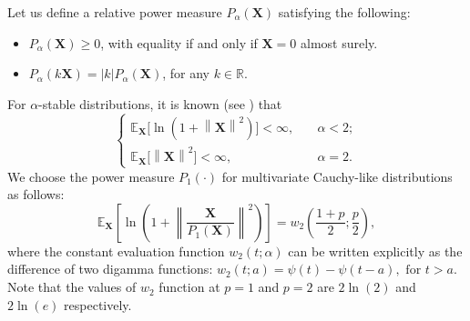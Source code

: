 \documentclass[conference]{IEEEtran}
\newcommand{\R}{\mathbb{R}}
\newcommand{\E}{\mathbb{E}}
\theoremstyle{definition}
\theoremstyle{plain}
\newcommand{\norm}[1]{\left\lVert#1\right\rVert}
\begin{document}

Let us define a relative power measure $P_{\alpha}(\mathbf{X})$ satisfying the following:
\begin{itemize}
    \item[P1)] $P_\alpha(\mathbf{X}) \geq 0$, with equality if and only if $\mathbf{X}=0$ almost surely.
    \item[P2)] $P_\alpha(k\mathbf{X})=|k|P_\alpha(\mathbf{X})$, for any $k\in\R$.
\end{itemize}
For $\alpha$-stable distributions, it is known (see \cite{fahs2017information}) that
\begin{equation}
\begin{cases}
\E_\mathbf{X}\big[\ln(1+\norm{\mathbf{X}}^2)\big]<\infty,\quad &\alpha<2;\\
\E_\mathbf{X}\big[\norm{\mathbf{X}}^2\big] < \infty,\quad &\alpha=2.
\end{cases}
\end{equation}
We choose the power measure $P_1(\cdot)$ for multivariate Cauchy-like distributions as follows:
\begin{equation}
    \E_\mathbf{X}\left[\ln\left(1+\norm{\frac{\mathbf{X}}{P_1(\mathbf{X})}}^2 \right)\right]
    = w_2\left(\frac{1+p}{2};\frac{p}{2}\right),
\end{equation}
where the constant evaluation function $w_2(t;\alpha)$ can be written explicitly as
the difference of two digamma functions:
$
    w_2(t;a) = \psi(t) - \psi(t-a), \text{\ for\ } t>a.
$
Note that the values of $w_2$ function at $p=1$ and $p=2$ are $2\ln(2)$ and $2\ln(e)$ respectively. 
\end{document}
